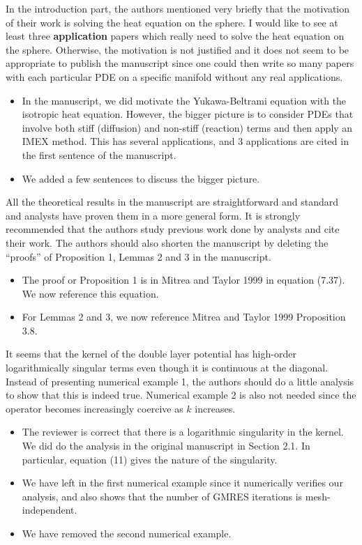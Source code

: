 \documentclass[11pt]{article}
\newcommand{\comment}[1]{{\color{blue} #1}}
\begin{document}
\comment{In the introduction part, the authors mentioned very briefly
that the motivation of their work is solving the heat equation on the
sphere.  I would like to see at least three {\bf application} papers
which really need to solve the heat equation on the sphere. Otherwise,
the motivation is not justified and it does not seem to be appropriate
to publish the manuscript since one could then write so many papers
with each particular PDE on a specific manifold without any real
applications.}
\begin{itemize}
  \item In the manuscript, we did motivate the Yukawa-Beltrami equation
  with the isotropic heat equation.  However, the bigger picture is to
  consider PDEs that involve both stiff (diffusion) and non-stiff
  (reaction) terms and then apply an IMEX method.  This has several
  applications, and 3 applications are cited in the first sentence of
  the manuscript.
  \item We added a few sentences to discuss the bigger picture.
\end{itemize}

\comment{All the theoretical results in the manuscript are
straightforward and standard and analysts have proven them in a more
general form. It is strongly recommended that the authors study
previous work done by analysts and cite their work. The authors should
also shorten the manuscript by deleting the “proofs” of Proposition 1,
Lemmas 2 and 3 in the manuscript.}
\begin{itemize}
  \item The proof or Proposition 1 is in Mitrea and Taylor 1999 in
  equation (7.37).  We now reference this equation.
  \item For Lemmas 2 and 3, we now reference Mitrea and Taylor 1999
  Proposition 3.8.
\end{itemize}

\comment{It seems that the kernel of the double layer potential has
high-order logarithmically singular terms even though it is continuous
at the diagonal. Instead of presenting numerical example 1, the authors
should do a little analysis to show that this is indeed true.
Numerical example 2 is also not needed since the operator becomes
increasingly coercive as $k$ increases.}
\begin{itemize}
  \item The reviewer is correct that there is a logarithmic singularity
  in the kernel.  We did do the analysis in the original manuscript in
  Section 2.1.  In particular, equation (11) gives the nature of the
  singularity.
  \item We have left in the first numerical example since it numerically
  verifies our analysis, and also shows that the number of GMRES
  iterations is mesh-independent.
  \item We have removed the second numerical example.
\end{itemize}
\end{document}

